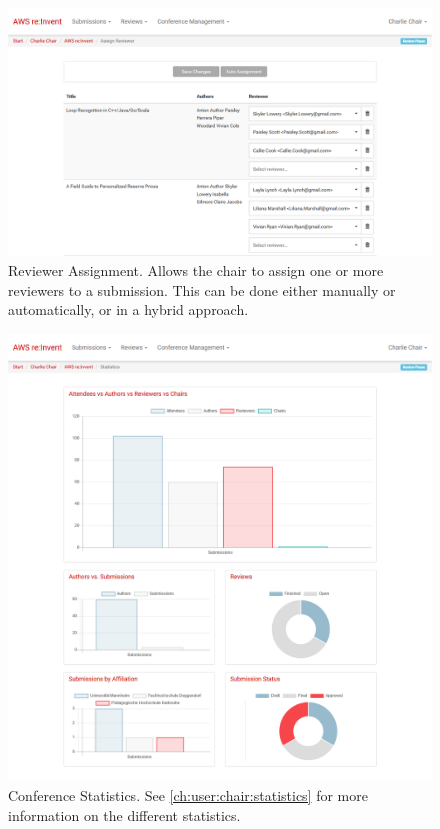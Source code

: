 \documentclass[nochapterpage,nopartpage,noheadingspace,numbersubsubsec,bigchapter,colorback,accentcolor=tud9c,10pt]{tudreport}
\begin{document}
        \begin{figure}[!ht]
            \centering
            \includegraphics[width=\textwidth]{img/ui-reviewer-assignment}
            \caption{Reviewer Assignment. Allows the chair to assign one or more reviewers to a submission. This can be done either manually or automatically, or in a hybrid approach.}
            \label{fig:appendix:screenshots:ui-reviewer-assignment}
        \end{figure}

        \begin{figure}[!ht]
            \centering
            \includegraphics[width=\textwidth]{img/ui-statistics}
            \caption{Conference Statistics. See \ref{ch:user:chair:statistics} for more information on the different statistics.}
            \label{fig:appendix:screenshots:ui-statistics}
        \end{figure}
\end{document}
